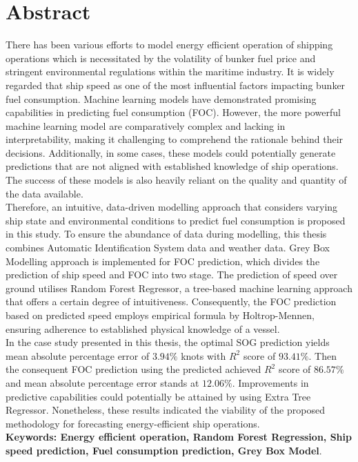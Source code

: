 \chapter*{Abstract}

There has been various efforts to model energy efficient operation of shipping operations which is necessitated by the volatility of bunker fuel price and stringent environmental regulations within the maritime industry. It is widely regarded that ship speed as one of the most influential factors impacting bunker fuel consumption. Machine learning models have demonstrated promising capabilities in predicting fuel consumption (FOC). However, the more powerful machine learning model are comparatively complex and lacking in interpretability, making it challenging to comprehend the rationale behind their decisions. Additionally, in some cases, these models could potentially generate predictions that are not aligned with established knowledge of ship operations. The success of these models is also heavily reliant on the quality and quantity of the data available.\\

Therefore, an intuitive, data-driven modelling approach that considers varying ship state and environmental conditions to predict fuel consumption is proposed in this study. To ensure the abundance of data during modelling, this thesis combines Automatic Identification System data and weather data. Grey Box Modelling approach is implemented for FOC prediction, which divides the prediction of ship speed and FOC into two stage. The prediction of speed over ground utilises Random Forest Regressor, a tree-based machine learning approach that offers a certain degree of intuitiveness. Consequently, the FOC prediction based on predicted speed employs empirical formula by Holtrop-Mennen, ensuring adherence to established physical knowledge of a vessel.\\

In the case study presented in this thesis, the optimal SOG prediction yields mean absolute percentage error of $3.94\%$ knots with $R^2$ score of $93.41\%$. Then the consequent FOC prediction using the predicted achieved $R^2$ score of $86.57\%$ and mean absolute percentage error stands at $12.06\%$. Improvements in predictive capabilities could potentially be attained by using Extra Tree Regressor. Nonetheless, these results indicated the viability of the proposed methodology for forecasting energy-efficient ship operations.\\



\textbf{\small Keywords: Energy efficient operation, Random Forest Regression, Ship speed prediction, Fuel consumption prediction, Grey Box Model}.